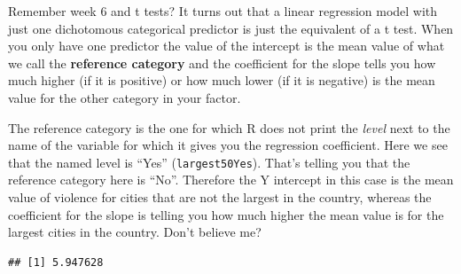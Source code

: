 \documentclass[
]{book}
\newenvironment{Shaded}{\begin{snugshade}}{\end{snugshade}}
\newcommand{\AttributeTok}[1]{\textcolor[rgb]{0.77,0.63,0.00}{#1}}
\newcommand{\CommentTok}[1]{\textcolor[rgb]{0.56,0.35,0.01}{\textit{#1}}}
\newcommand{\ConstantTok}[1]{\textcolor[rgb]{0.00,0.00,0.00}{#1}}
\newcommand{\FunctionTok}[1]{\textcolor[rgb]{0.00,0.00,0.00}{#1}}
\newcommand{\NormalTok}[1]{#1}
\newcommand{\SpecialCharTok}[1]{\textcolor[rgb]{0.00,0.00,0.00}{#1}}
\newcommand{\StringTok}[1]{\textcolor[rgb]{0.31,0.60,0.02}{#1}}
\begin{document}
Remember week 6 and t tests? It turns out that a linear regression model with just one dichotomous categorical predictor is just the equivalent of a t test. When you only have one predictor the value of the intercept is the mean value of what we call the \textbf{reference category} and the coefficient for the slope tells you how much higher (if it is positive) or how much lower (if it is negative) is the mean value for the other category in your factor.

The reference category is the one for which R does not print the \emph{level} next to the name of the variable for which it gives you the regression coefficient. Here we see that the named level is ``Yes'' (\texttt{largest50Yes}). That's telling you that the reference category here is ``No''. Therefore the Y intercept in this case is the mean value of violence for cities that are not the largest in the country, whereas the coefficient for the slope is telling you how much higher the mean value is for the largest cities in the country. Don't believe me?

\begin{Shaded}
\end{Shaded}

\begin{verbatim}
## [1] 5.947628
\end{verbatim}

\begin{Shaded}
\end{Shaded}
\end{document}
